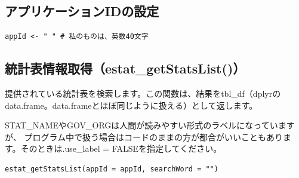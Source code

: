 \documentclass[
  xelatex, ja=standard]{bxjsbook}
\theoremstyle{definition}
\theoremstyle{definition}
\theoremstyle{definition}
\theoremstyle{definition}
\theoremstyle{remark}
\begin{document}
\hypertarget{ux30a2ux30d7ux30eaux30b1ux30fcux30b7ux30e7ux30f3idux306eux8a2dux5b9a-1}{%
\subsection{アプリケーションIDの設定}\label{ux30a2ux30d7ux30eaux30b1ux30fcux30b7ux30e7ux30f3idux306eux8a2dux5b9a-1}}

\begin{verbatim}
appId <- " " # 私のものは、英数40文字
\end{verbatim}

\hypertarget{ux7d71ux8a08ux8868ux60c5ux5831ux53d6ux5f97estat_getstatslist}{%
\subsection{統計表情報取得（estat\_getStatsList()）}\label{ux7d71ux8a08ux8868ux60c5ux5831ux53d6ux5f97estat_getstatslist}}

提供されている統計表を検索します。この関数は、結果をtbl\_df（dplyrのdata.frame。data.frameとほぼ同じように扱える）として返します。

STAT\_NAMEやGOV\_ORGは人間が読みやすい形式のラベルになっていますが、 プログラム中で扱う場合はコードのままの方が都合がいいこともあります。そのときは.use\_label = FALSEを指定してください。

\begin{verbatim}
estat_getStatsList(appId = appId, searchWord = "")
\end{verbatim}
\end{document}
